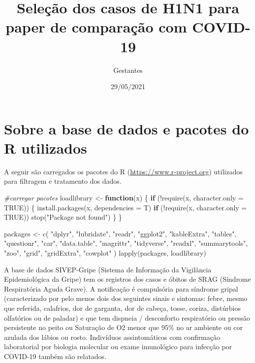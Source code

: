 \documentclass[
]{article}
\title{Seleção dos casos de H1N1 para paper de comparação com COVID-19}
\author{Gestantes}
\date{29/05/2021}
\newenvironment{Shaded}{\begin{snugshade}}{\end{snugshade}}
\newcommand{\AttributeTok}[1]{\textcolor[rgb]{0.77,0.63,0.00}{#1}}
\newcommand{\CommentTok}[1]{\textcolor[rgb]{0.56,0.35,0.01}{\textit{#1}}}
\newcommand{\ConstantTok}[1]{\textcolor[rgb]{0.00,0.00,0.00}{#1}}
\newcommand{\ControlFlowTok}[1]{\textcolor[rgb]{0.13,0.29,0.53}{\textbf{#1}}}
\newcommand{\FunctionTok}[1]{\textcolor[rgb]{0.00,0.00,0.00}{#1}}
\newcommand{\NormalTok}[1]{#1}
\newcommand{\OtherTok}[1]{\textcolor[rgb]{0.56,0.35,0.01}{#1}}
\newcommand{\SpecialCharTok}[1]{\textcolor[rgb]{0.00,0.00,0.00}{#1}}
\newcommand{\StringTok}[1]{\textcolor[rgb]{0.31,0.60,0.02}{#1}}
\begin{document}
\maketitle

\hypertarget{sobre-a-base-de-dados-e-pacotes-do-r-utilizados}{%
\section{Sobre a base de dados e pacotes do R
utilizados}\label{sobre-a-base-de-dados-e-pacotes-do-r-utilizados}}

A seguir são carregados os pacotes do R
(\url{https://www.r-project.org}) utilizados para filtragem e tratamento
dos dados.

\begin{Shaded}
\begin{Highlighting}[]
\CommentTok{\#carregar pacotes}
\NormalTok{loadlibrary }\OtherTok{\textless{}{-}} \ControlFlowTok{function}\NormalTok{(x) \{}
  \ControlFlowTok{if}\NormalTok{ (}\SpecialCharTok{!}\FunctionTok{require}\NormalTok{(x, }\AttributeTok{character.only =} \ConstantTok{TRUE}\NormalTok{)) \{}
    \FunctionTok{install.packages}\NormalTok{(x, }\AttributeTok{dependencies =}\NormalTok{ T)}
    \ControlFlowTok{if}\NormalTok{ (}\SpecialCharTok{!}\FunctionTok{require}\NormalTok{(x, }\AttributeTok{character.only =} \ConstantTok{TRUE}\NormalTok{))}
      \FunctionTok{stop}\NormalTok{(}\StringTok{"Package not found"}\NormalTok{)}
\NormalTok{  \}}
\NormalTok{\}}

\NormalTok{packages }\OtherTok{\textless{}{-}}
  \FunctionTok{c}\NormalTok{(}
    \StringTok{"dplyr"}\NormalTok{,}
    \StringTok{"lubridate"}\NormalTok{,}
    \StringTok{"readr"}\NormalTok{,}
    \StringTok{"ggplot2"}\NormalTok{,}
    \StringTok{"kableExtra"}\NormalTok{,}
    \StringTok{"tables"}\NormalTok{,}
    \StringTok{"questionr"}\NormalTok{,}
    \StringTok{"car"}\NormalTok{,}
    \StringTok{"data.table"}\NormalTok{,}
    \StringTok{"magrittr"}\NormalTok{,}
    \StringTok{"tidyverse"}\NormalTok{,}
    \StringTok{"readxl"}\NormalTok{,}
    \StringTok{"summarytools"}\NormalTok{,}
    \StringTok{"zoo"}\NormalTok{,}
    \StringTok{"grid"}\NormalTok{,}
    \StringTok{"gridExtra"}\NormalTok{,}
    \StringTok{"cowplot"}
\NormalTok{  )}
\FunctionTok{lapply}\NormalTok{(packages, loadlibrary)}
\end{Highlighting}
\end{Shaded}

A base de dados SIVEP-Gripe (Sistema de Informação da Vigilância
Epidemiológica da Gripe) tem os registros dos casos e óbitos de SRAG
(Síndrome Respiratória Aguda Grave). A notificação é compulsória para
síndrome gripal (caracterizado por pelo menos dois dos seguintes sinais
e sintomas: febre, mesmo que referida, calafrios, dor de garganta, dor
de cabeça, tosse, coriza, distúrbios olfatórios ou de paladar) e que tem
dispneia / desconforto respiratório ou pressão persistente no peito ou
Saturação de O2 menor que 95\% no ar ambiente ou cor azulada dos lábios
ou rosto. Indivíduos assintomáticos com confirmação laboratorial por
biologia molecular ou exame imunológico para infecção por COVID-19
também são relatados.
\end{document}
